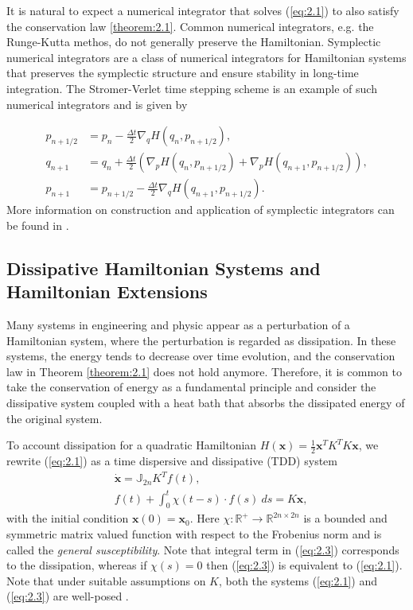 It is natural to expect a numerical integrator that solves (\ref{eq:2.1}) to also satisfy the conservation law \ref{theorem:2.1}. Common numerical integrators, e.g. the Runge-Kutta methos, do not generally preserve the Hamiltonian. Symplectic numerical integrators are a class of numerical integrators for Hamiltonian systems that preserves the symplectic structure and ensure stability in long-time integration. The Str\:omer-Verlet time stepping scheme is an example of such numerical integrators and is given by

\begin{equation} \label{eq:2.3}
\begin{aligned}
	p_{n+1/2} &= p_n - \frac{\Delta t}{2} \nabla_qH(q_{n},p_{n+1/2}), \\
	q_{n+1} &= q_n + \frac{\Delta t}{2} \left( \nabla_pH(q_{n},p_{n+1/2}) + \nabla_pH(q_{n+1},p_{n+1/2}) \right),\\
	p_{n+1} &= p_{n+1/2} - \frac{\Delta t}{2} \nabla_qH(q_{n+1},p_{n+1/2}).
\end{aligned}
\end{equation}
More information on construction and application of symplectic integrators can be found in \cite{Hairer:1250576}.

\subsection{Dissipative Hamiltonian Systems and Hamiltonian Extensions}

Many systems in engineering and physic appear as a perturbation of a Hamiltonian system, where the perturbation is regarded as dissipation. In these systems, the energy tends to decrease over time evolution, and the conservation law in Theorem \ref{theorem:2.1} does not hold anymore. Therefore, it is common to take the conservation of energy as a fundamental principle and consider the dissipative system coupled with a heat bath that absorbs the dissipated energy of the original system. 

To account dissipation for a quadratic Hamiltonian $H(\mathbf x) = \frac 1 2 \mathbf x^T K^T K \mathbf x$, we rewrite (\ref{eq:2.1}) as a time dispersive and dissipative (TDD) \cite{Figotin:2006jy} system 
\begin{equation} \label{eq:2.4}
	\begin{aligned}
		& \dot {\mathbf x} = \mathbb J_{2n} K^T f(t), \\
		& f(t) + \int_0^t \chi(t-s) \cdot f(s)\ ds = K\mathbf x,
	\end{aligned}
\end{equation}
with the initial condition $\mathbf x(0) = \mathbf x_0$. Here $\chi:\mathbb R^+\to \mathbb R^{2n\times 2n}$ is a bounded and symmetric matrix valued function with respect to the Frobenius norm and is called the \emph{general susceptibility}. Note that integral term in (\ref{eq:2.3}) corresponds to the dissipation, whereas if $\chi(s) = 0$ then (\ref{eq:2.3}) is equivalent to (\ref{eq:2.1}). Note that under suitable assumptions on $K$, both the systems (\ref{eq:2.1}) and (\ref{eq:2.3}) are well-posed \cite{Figotin:2006jy}.

